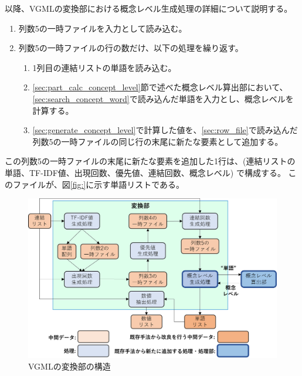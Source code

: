 以降、VGMLの変換部における概念レベル生成処理の詳細について説明する。

\begin{enumerate}
    \item 列数5の一時ファイルを入力として読み込む。
    \label{sec:row5_file}
    \item 列数5の一時ファイルの行の数だけ、以下の処理を繰り返す。
        \begin{enumerate}
            \item 1列目の連結リストの単語を読み込む。
            \label{sec:search_concept_word}
            \item \ref{sec:part_calc_concept_level}節で述べた概念レベル算出部において、\ref{sec:search_concept_word}で読み込んだ単語を入力とし、概念レベルを計算する。
            \label{sec:generate_concept_level}
            \item \ref{sec:generate_concept_level}で計算した値を、\ref{sec:row_file}で読み込んだ列数5の一時ファイルの同じ行の末尾に新たな要素として追加する。
        \end{enumerate}
\end{enumerate}

この列数5の一時ファイルの末尾に新たな要素を追加した1行は、(連結リストの単語、TF-IDF値、出現回数、優先値、連結回数、概念レベル) で構成する。
このファイルが、図\ref{fig:}に示す単語リストである。

\begin{figure}[t]
    \begin{center}
        \includegraphics[width=1.0\columnwidth]{image/vgml_transfer.png}
        \caption{VGMLの変換部の構造}
        \label{fig:vgml_transfer}
    \end{center}
\end{figure}

